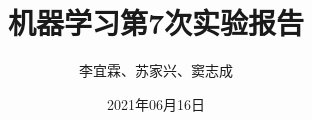 



\title{机器学习第7次实验报告}
\author{李宜霖、苏家兴、窦志成}
\date{2021年06月16日}
\maketitle

\newpage
\tableofcontents

\newpage






